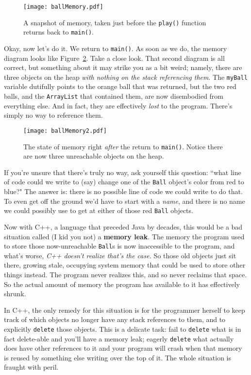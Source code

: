 \begin{figure}[ht]
\centering
\texttt{[image: ballMemory.pdf]}    %
\caption{A snapshot of memory, taken just before the \texttt{play()} function
returns back to \texttt{main()}.}
\label{fig:ballMemory}
\end{figure}

Okay, now let's do it. We return to \texttt{main()}. As soon as we do, the
memory diagram looks like Figure~\ref{fig:ballMemory2}. Take a close look.
That second diagram is all correct, but something about it may strike you as a
bit weird; namely, there are three objects on the heap \textit{with nothing on
the stack referencing them}. The \texttt{myBall} variable dutifully points to
the orange ball that was returned, but the two red balls, and the
\texttt{ArrayList} that contained them, are now disembodied from everything
else. And in fact, they are effectively \textit{lost} to the program. There's
simply no way to reference them. 

\begin{figure}[ht]
\centering
\texttt{[image: ballMemory2.pdf]}    %
\caption{The state of memory right \textit{after} the return to
\texttt{main()}. Notice there are now three unreachable objects on the heap.}
\label{fig:ballMemory2}
\end{figure}

If you're unsure that there's truly no way, ask yourself this question: ``what
line of code could we write to (say) change one of the \texttt{Ball} object's
color from red to blue?" The answer is: there is no possible line of code we
could write to do that. To even get off the ground we'd have to start with a
\textit{name}, and there is no name we could possibly use to get at either of
those red \texttt{Ball} objects.

Now with C++, a language that preceded Java by decades, this would be a bad
situation called (I kid you not) a \textbf{memory leak}. The memory the
program used to store those now-unreachable \texttt{Ball}s is now inaccessible
to the program, and what's worse, \textit{C++ doesn't realize that's the
case.} So those old objects just sit there, growing stale, occupying system
memory that could be used to store other things instead. The program never
realizes this, and so never reclaims that space. So the actual amount of
memory the program has available to it has effectively shrunk.

In C++, the only remedy for this situation is for the programmer herself to
keep track of which objects no longer have any stack references to them, and
to explicitly \texttt{delete} those objects. This is a delicate task: fail to
\texttt{delete} what is in fact delete-able and you'll have a memory leak;
eagerly \texttt{delete} what actually does have other references to it and
your program will crash when that memory is reused by something else writing
over the top of it. The whole situation is fraught with peril.

